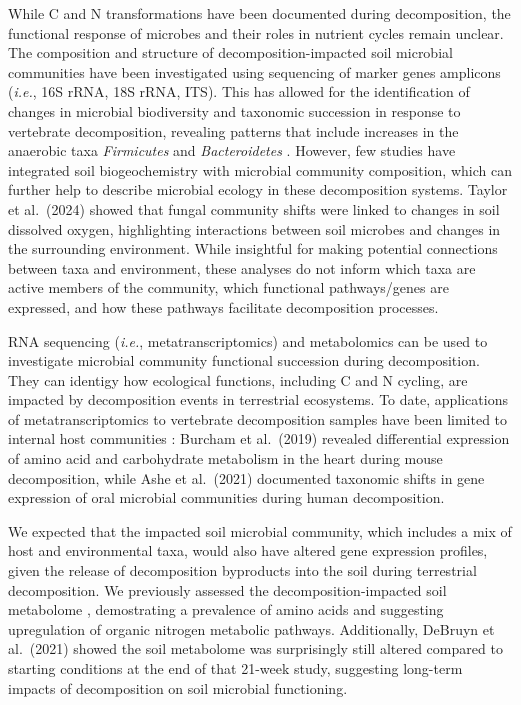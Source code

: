 \documentclass[
  sn-nature,
  lineno, referee]{sn-jnl}
\begin{document}
While C and N transformations have been documented during decomposition,
the functional response of microbes and their roles in nutrient cycles
remain unclear. The composition and structure of decomposition-impacted
soil microbial communities have been investigated using sequencing of
marker genes amplicons (\emph{i.e.}, 16S rRNA, 18S rRNA, ITS). This has
allowed for the identification of changes in microbial biodiversity and
taxonomic succession in response to vertebrate decomposition, revealing
patterns that include increases in the anaerobic taxa \emph{Firmicutes}
and \emph{Bacteroidetes} \citep{mason_microbial_2023}. However, few
studies have integrated soil biogeochemistry with microbial community
composition, which can further help to describe microbial ecology in
these decomposition systems. Taylor et al.~(2024)
\citep{taylor_transient_2024} showed that fungal community shifts were
linked to changes in soil dissolved oxygen, highlighting interactions
between soil microbes and changes in the surrounding environment. While
insightful for making potential connections between taxa and
environment, these analyses do not inform which taxa are active members
of the community, which functional pathways/genes are expressed, and how
these pathways facilitate decomposition processes.

RNA sequencing (\emph{i.e.}, metatranscriptomics) and metabolomics can
be used to investigate microbial community functional succession during
decomposition. They can identigy how ecological functions, including C
and N cycling, are impacted by decomposition events in terrestrial
ecosystems. To date, applications of metatranscriptomics to vertebrate
decomposition samples have been limited to internal host communities
\citep{burcham_total_2019, ashe_characterization_2021}: Burcham et
al.~(2019) \citep{burcham_total_2019} revealed differential expression
of amino acid and carbohydrate metabolism in the heart during mouse
decomposition, while Ashe et al.~(2021)
\citep{ashe_characterization_2021} documented taxonomic shifts in gene
expression of oral microbial communities during human decomposition.

We expected that the impacted soil microbial community, which includes a
mix of host and environmental taxa, would also have altered gene
expression profiles, given the release of decomposition byproducts into
the soil during terrestrial decomposition. We previously assessed the
decomposition-impacted soil metabolome \citep{debruyn_comparative_2021},
demostrating a prevalence of amino acids and suggesting upregulation of
organic nitrogen metabolic pathways. Additionally, DeBruyn et al.~(2021)
\citep{debruyn_comparative_2021} showed the soil metabolome was
surprisingly still altered compared to starting conditions at the end of
that 21-week study, suggesting long-term impacts of decomposition on
soil microbial functioning.
\end{document}
